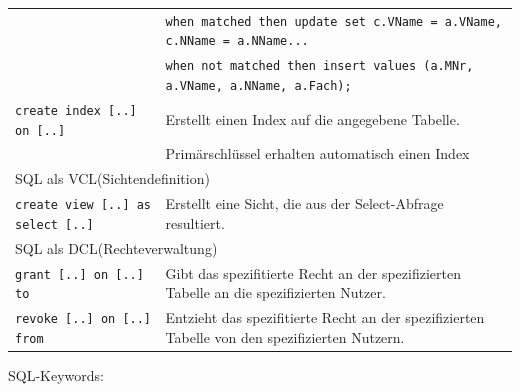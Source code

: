 \documentclass{article}
\begin{document}
\begin{center}
\begin{longtable}{|p{4cm}|p{7cm}|}
    & \texttt{when matched then update set c.VName = a.VName, c.NName = a.NName...} \\
    & \texttt{when not matched then insert values (a.MNr, a.VName, a.NName, a.Fach);} \\
    \hline
    \texttt{create index [..] on [..]} & Erstellt einen Index auf die angegebene Tabelle. \\
    & Primärschlüssel erhalten automatisch einen Index \\
    \hline
    \multicolumn{2}{|p{11cm}|}{SQL als VCL(Sichtendefinition)} \\
    \hline
    \texttt{create view [..] as select [..]} & Erstellt eine Sicht, die aus der Select-Abfrage resultiert. \\
    \hline
    \multicolumn{2}{|p{11cm}|}{SQL als DCL(Rechteverwaltung)} \\
    \hline
    \texttt{grant [..] on [..] to} &  Gibt das spezifitierte Recht an der spezifizierten Tabelle an die spezifizierten Nutzer.\\
    \hline
    \texttt{revoke [..] on [..] from} & Entzieht das spezifitierte Recht an der spezifizierten Tabelle von den spezifizierten Nutzern. \\
    \hline
  \end{longtable}
\end{center}
SQL-Keywords:
\end{document}
